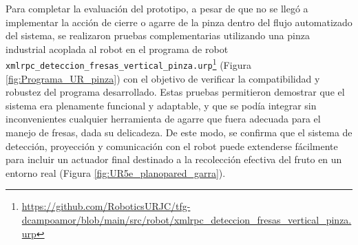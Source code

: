 Para completar la evaluación del prototipo, a pesar de que no se llegó a implementar la acción de cierre o agarre de la pinza dentro del flujo automatizado del sistema, se realizaron pruebas complementarias utilizando una pinza industrial acoplada al robot en el programa de robot \verb|xmlrpc_deteccion_fresas_vertical_pinza.urp|\footnote{\url{https://github.com/RoboticsURJC/tfg-dcampoamor/blob/main/src/robot/xmlrpc_deteccion_fresas_vertical_pinza.urp}} (Figura \ref{fig:Programa_UR_pinza}) con el objetivo de verificar la compatibilidad y robustez del programa desarrollado. Estas pruebas permitieron demostrar que el sistema era plenamente funcional y adaptable, y que se podía integrar sin inconvenientes cualquier herramienta de agarre que fuera adecuada para el manejo de fresas, dada su delicadeza. De este modo, se confirma que el sistema de detección, proyección y comunicación con el robot puede extenderse fácilmente para incluir un actuador final destinado a la recolección efectiva del fruto en un entorno real (Figura \ref{fig:UR5e_planopared_garra}).

